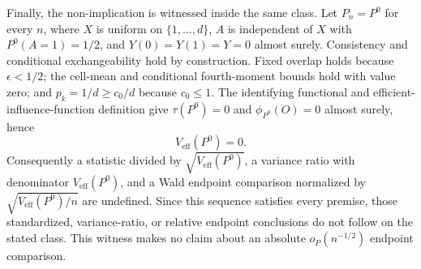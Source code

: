 Finally, the non-implication is witnessed inside the same class.  Let
\(P_n=P^0\) for every \(n\), where \(X\) is uniform on
\(\{1,\ldots,d\}\), \(A\) is independent of \(X\) with
\(P^0(A=1)=1/2\), and \(Y(0)=Y(1)=Y=0\) almost surely.  Consistency and
conditional exchangeability hold by construction.  Fixed overlap holds
because \(\epsilon<1/2\); the cell-mean and conditional fourth-moment bounds
hold with value zero; and \(p_k=1/d\ge c_0/d\) because \(c_0\le1\).
The identifying functional and efficient-influence-function definition give
\(\tau(P^0)=0\) and \(\phi_{P^0}(O)=0\) almost surely, hence
\[
 V_{\mathrm{eff}}(P^0)=0.                                         \tag{26}
\]
Consequently a statistic divided by \(\sqrt{V_{\mathrm{eff}}(P^0)}\), a
variance ratio with denominator \(V_{\mathrm{eff}}(P^0)\), and a Wald
endpoint comparison normalized by
\(\sqrt{V_{\mathrm{eff}}(P^0)/n}\) are undefined.  Since this sequence
satisfies every premise, those standardized, variance-ratio, or relative
endpoint conclusions do not follow on the stated class.  This witness makes
no claim about an absolute \(o_P(n^{-1/2})\) endpoint comparison.
